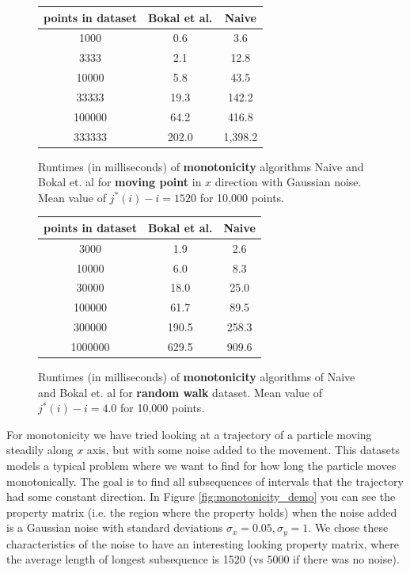 \documentclass{article}
\begin{document}
\begin{figure}[!ht]
    \centering
    \begin{tabular}{c|c|c}
        points in dataset & Bokal et al. & Naive  \\
    \hline
        1000    & 0.6    & 3.6  \\
    \hline
        3333    & 2.1    & 12.8  \\
    \hline
        10000    & 5.8    & 43.5  \\
    \hline
        33333    & 19.3    & 142.2  \\
    \hline
        100000    & 64.2    & 416.8  \\
    \hline
        333333    & 202.0    & 1,398.2  \\
    \end{tabular}
    \caption{Runtimes (in milliseconds) of \textbf{monotonicity}
    algorithms Naive and Bokal et. al for \textbf{moving point} in
    $x$ direction with Gaussian noise. Mean value of $j^*(i) - i =
    1520$ for 10,000 points.}
    \label{fig:monotonicity_comparison_moving_gaussian}
\end{figure}

\begin{figure}[!ht]
    \centering
	\begin{tabular}{c|c|c}
	    points in dataset   & Bokal et al. & Naive  \\
	\hline
	    3000    & 1.9    & 2.6  \\
	\hline
	    10000    & 6.0    & 8.3  \\
	\hline
	    30000    & 18.0    & 25.0  \\
	\hline
	    100000    & 61.7    & 89.5  \\
	\hline
	    300000    & 190.5    & 258.3  \\
	\hline
	    1000000    & 629.5    & 909.6 
	\end{tabular}
    \caption{Runtimes (in milliseconds) of \textbf{monotonicity}
    algorithms of Naive and Bokal et. al for \textbf{random walk}
    dataset. Mean value of $j^*(i) - i = 4.0$ for 10,000 points.}
    \label{fig:monotonicity_comparison_random_walk}
\end{figure}

For monotonicity we have tried looking at a trajectory of a particle
moving steadily along $x$ axis, but with some noise added to the
movement. This datasets models a typical problem where we want to
find for how long the particle moves monotonically. The goal is to
find all subsequences of intervals that the trajectory had some
constant direction. In Figure \ref{fig:monotonicity_demo} you can
see the property matrix (i.e. the region where the property holds)
when the noise added is a Gaussian noise with standard deviations
$\sigma_x = 0.05, \sigma_y = 1$. We chose these characteristics of
the noise to have an interesting looking property matrix, where the
average length of longest subsequence is 1520 (vs 5000 if there was
no noise).
\end{document}
